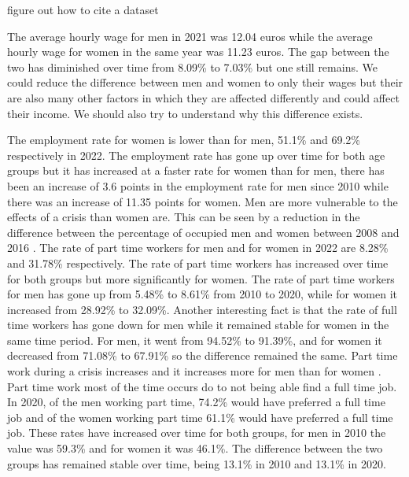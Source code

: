 \documentclass[12pt]{article}
\begin{document}
\begin{spacing}{1.5}

figure out how to cite a dataset

The average hourly wage for men in 2021 was 12.04 euros while the average hourly wage for women in the same year was 11.23 euros. The gap between the two has diminished over time from 8.09\% to 7.03\% but one still remains. We could reduce the difference between men and women to only their wages but their are also many other factors in which they are affected differently and could affect their income. We should also try to understand why this difference exists.

The employment rate for women is lower than for men, 51.1\% and 69.2\% respectively in 2022. The employment rate has gone up over time for both age groups but it has increased at a faster rate for women than for men, there has been an increase of 3.6 points in the employment rate for men since 2010 while there was an increase of 11.35 points for women. Men are more vulnerable to the effects of a crisis than women are. This can be seen by a reduction in the difference between the percentage of occupied men and women between 2008 and 2016 \cite{canal2018punto}. The rate of part time workers for men and for women in 2022 are 8.28\% and 31.78\% respectively. The rate of part time workers has increased over time for both groups but more significantly for women. The rate of part time workers for men has gone up from 5.48\% to 8.61\% from 2010 to 2020, while for women it increased from 28.92\% to 32.09\%. Another interesting fact is that the rate of full time workers has gone down for men while it remained stable for women in the same time period. For men, it went from 94.52\% to 91.39\%, and for women it decreased from 71.08\% to 67.91\% so the difference remained the same. Part time work during a crisis increases and it increases more for men than for women \cite{canal2018punto}. Part time work most of the time occurs do to not being able find a full time job. In 2020, of the men working part time, 74.2\% would have preferred a full time job and of the women working part time 61.1\% would have preferred a full time job. These rates have increased over time for both groups, for men in 2010 the value was 59.3\% and for women it was 46.1\%. The difference between the two groups has remained stable over time, being 13.1\% in 2010 and 13.1\% in 2020.


\end{spacing}
\end{document}
